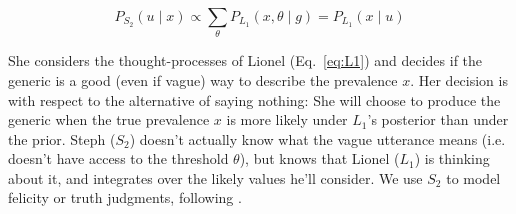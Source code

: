 \documentclass[10pt,letterpaper]{article}
\begin{document}
\begin{equation} 
P_{S_{2}}(u \mid x) \propto  \sum_{\theta} P_{L_{1}}(x , \theta \mid g) =  P_{L_{1}}(x \mid u)
\label{eq:S2}
\end{equation}

She considers the thought-processes of Lionel (Eq.~\ref{eq:L1}) and decides if the generic is a good (even if vague) way to describe the prevalence $x$. 
Her decision is with respect to the alternative of saying nothing: She will choose to produce the generic when the true prevalence $x$ is more likely under $L_1$'s posterior than under the prior. 
Steph ($S_{2}$) doesn't actually know what the vague utterance means (i.e. doesn't have access to the threshold $\theta$), but knows that Lionel ($L_{1}$) is thinking about it, and integrates over the likely values he'll consider.
We use $S_{2}$ to model felicity or truth judgments, following .
%


%





\end{document}
